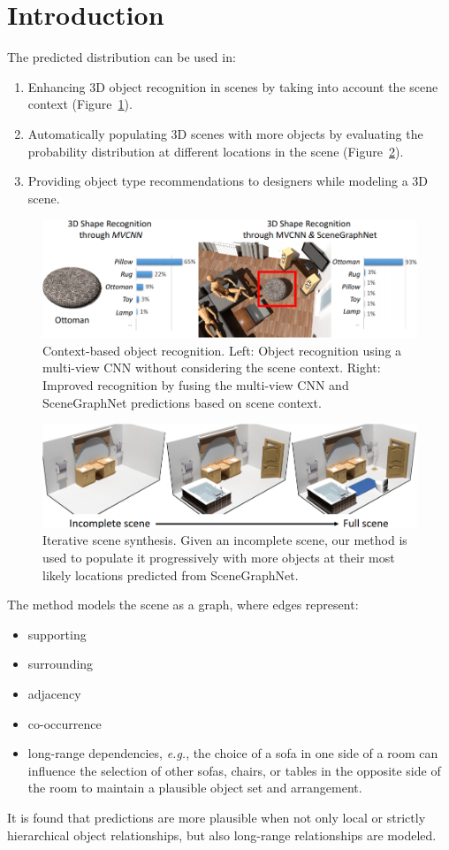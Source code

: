 \documentclass[10pt]{article}
\newcommand{\Fig}[1]{Figure~\ref{fig:#1}}
\begin{document}
\section{Introduction}%
\label{sec:introduction}
The predicted distribution can be used in:
%
\begin{enumerate}
  \item Enhancing 3D object recognition in scenes by taking  into account the
    scene context (\Fig{2}).
  \item Automatically populating 3D scenes with more objects by evaluating the
    probability distribution at different locations in the scene (\Fig{3}).
  \item Providing object type recommendations to designers while modeling a 3D
    scene.
\end{enumerate}
%
\begin{figure}[htpb]
  \centering
  \includegraphics[width=0.8\linewidth]{fig_2.png}
  \caption{Context-based object recognition. Left: Object recognition using a
    multi-view CNN without considering the scene context. Right: Improved
    recognition by fusing the multi-view CNN and SceneGraphNet predictions
    based on scene context.}%
  \label{fig:2}
\end{figure}
%
\begin{figure}[htpb]
  \centering
  \includegraphics[width=0.8\linewidth]{fig_3.png}
  \caption{Iterative scene synthesis. Given an incomplete scene, our method is
    used to populate it progressively with more objects at their most likely
    locations predicted from SceneGraphNet.}%
  \label{fig:3}
\end{figure}

The method models the scene as a graph, where edges represent:
%
\begin{itemize}
  \item supporting
  \item surrounding
  \item adjacency
  \item co-occurrence
  \item long-range dependencies, \textit{e.g.}, the choice of a sofa in one
    side of a room can influence the selection of other sofas, chairs, or
    tables in the opposite side of the room to maintain a plausible object set
    and arrangement.
\end{itemize}
%
It is found that predictions are more plausible when not only local or strictly
hierarchical object relationships, but also long-range relationships are
modeled.
\end{document}
